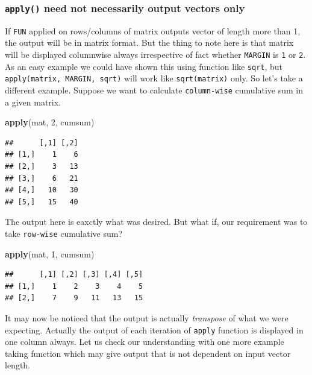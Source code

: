 \documentclass[
]{book}
\newenvironment{Shaded}{\begin{snugshade}}{\end{snugshade}}
\newcommand{\DecValTok}[1]{\textcolor[rgb]{0.00,0.00,0.81}{#1}}
\newcommand{\FunctionTok}[1]{\textcolor[rgb]{0.13,0.29,0.53}{\textbf{#1}}}
\newcommand{\NormalTok}[1]{#1}
\begin{document}
\hypertarget{apply-need-not-necessarily-output-vectors-only}{%
\subsubsection*{\texorpdfstring{\texttt{apply()} need not necessarily output vectors only}{apply() need not necessarily output vectors only}}\label{apply-need-not-necessarily-output-vectors-only}}

If \texttt{FUN} applied on rows/columns of matrix outputs vector of length more than 1, the output will be in matrix format. But the thing to note here is that matrix will be displayed columnwise always irrespective of fact whether \texttt{MARGIN} is \texttt{1} or \texttt{2}. As an easy example we could have shown this using function like \texttt{sqrt}, but \texttt{apply(matrix,\ MARGIN,\ sqrt)} will work like \texttt{sqrt(matrix)} only. So let's take a different example. Suppose we want to calculate \texttt{column-wise} cumulative sum in a given matrix.

\begin{Shaded}
\begin{Highlighting}[]
\FunctionTok{apply}\NormalTok{(mat, }\DecValTok{2}\NormalTok{, cumsum)}
\end{Highlighting}
\end{Shaded}

\begin{verbatim}
##      [,1] [,2]
## [1,]    1    6
## [2,]    3   13
## [3,]    6   21
## [4,]   10   30
## [5,]   15   40
\end{verbatim}

The output here is eaxctly what was desired. But what if, our requirement was to take \texttt{row-wise} cumulative sum?

\begin{Shaded}
\begin{Highlighting}[]
\FunctionTok{apply}\NormalTok{(mat, }\DecValTok{1}\NormalTok{, cumsum)}
\end{Highlighting}
\end{Shaded}

\begin{verbatim}
##      [,1] [,2] [,3] [,4] [,5]
## [1,]    1    2    3    4    5
## [2,]    7    9   11   13   15
\end{verbatim}

It may now be noticed that the output is actually \emph{transpose} of what we were expecting. Actually the output of each iteration of \texttt{apply} function is displayed in one column always. Let us check our understanding with one more example taking function which may give output that is not dependent on input vector length.
\end{document}
